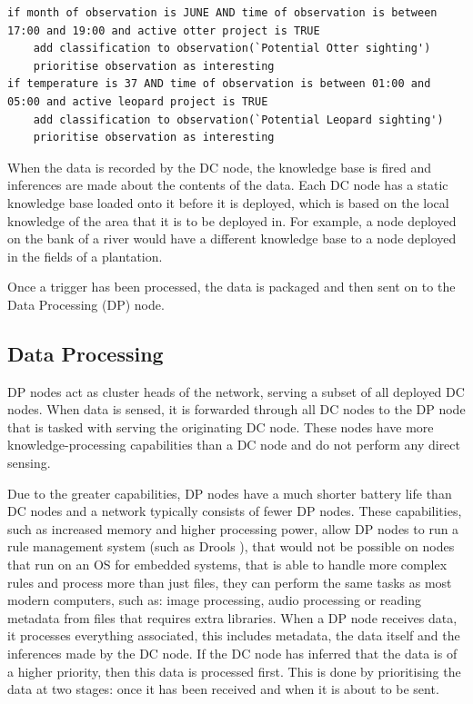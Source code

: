 \begin{lstlisting}[breaklines=true, caption={Pseudocode DC Node Rules}, label={kb:dcrule}]
if month of observation is JUNE AND time of observation is between 17:00 and 19:00 and active otter project is TRUE
	add classification to observation(`Potential Otter sighting')
	prioritise observation as interesting
if temperature is 37 AND time of observation is between 01:00 and 05:00 and active leopard project is TRUE
	add classification to observation(`Potential Leopard sighting')
	prioritise observation as interesting
\end{lstlisting}

When the data is recorded by the DC node, the knowledge base is fired and inferences are made about the contents of the data. Each DC node has a static knowledge base loaded onto it before it is deployed, which is based on the local knowledge of the area that it is to be deployed in.  For example, a node deployed on the bank of a river would have a different knowledge base to a node deployed in the fields of a plantation.

Once a trigger has been processed, the data is packaged and then sent on to the Data Processing (DP) node.

	\subsection{Data Processing}\label{khas:dp}
	DP nodes act as cluster heads of the network, serving a subset of all deployed DC nodes. When data is sensed, it is forwarded through all DC nodes to the DP node that is tasked with serving the originating DC node. These nodes have more knowledge-processing capabilities than a DC node and do not perform any direct sensing. 

	Due to the greater capabilities, DP nodes have a much shorter battery life than DC nodes and a network typically consists of fewer DP nodes. These capabilities, such as increased memory and higher processing power, allow DP nodes to run a rule management system (such as Drools \cite{proctor2005drools}), that would not be possible on nodes that run on an OS for embedded systems, that is able to handle more complex rules and process more than just files, they can perform the same tasks as most modern computers, such as: image processing, audio processing or reading metadata from files that requires extra libraries. When a DP node receives data, it processes everything associated, this includes metadata, the data itself and the inferences made by the DC node. If the DC node has inferred that the data is of a higher priority, then this data is processed first. This is done by prioritising the data at two stages: once it has been received and when it is about to be sent.

